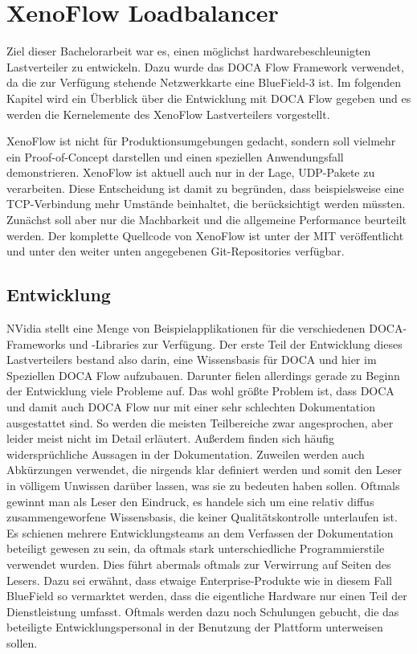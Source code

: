 \chapter{XenoFlow Loadbalancer}
\label{cha:implementation}
Ziel dieser Bachelorarbeit war es, einen möglichst hardwarebeschleunigten Lastverteiler zu entwickeln. Dazu wurde das DOCA Flow Framework verwendet, da die zur Verfügung stehende Netzwerkkarte eine BlueField-3 ist. Im folgenden Kapitel wird ein Überblick über die Entwicklung mit DOCA Flow gegeben und es werden die Kernelemente des XenoFlow Lastverteilers vorgestellt. 

XenoFlow ist nicht für Produktionsumgebungen gedacht, sondern soll vielmehr ein Proof-of-Concept darstellen und einen speziellen Anwendungsfall demonstrieren. XenoFlow ist aktuell auch nur in der Lage, UDP-Pakete zu verarbeiten. Diese Entscheidung ist damit zu begründen, dass beispielsweise eine TCP-Verbindung mehr Umstände beinhaltet, die berücksichtigt werden müssten. Zunächst soll aber nur die Machbarkeit und die allgemeine Performance beurteilt werden. Der komplette Quellcode von XenoFlow ist unter der MIT veröffentlicht und unter den weiter unten angegebenen Git-Repositories verfügbar.
\section{Entwicklung}
NVidia stellt eine Menge von Beispielapplikationen für die verschiedenen DOCA-Frameworks und -Libraries zur Verfügung. Der erste Teil der Entwicklung dieses Lastverteilers bestand also darin, eine Wissensbasis für DOCA und hier im Speziellen DOCA Flow aufzubauen. Darunter fielen allerdings gerade zu Beginn der Entwicklung viele Probleme auf. Das wohl größte Problem ist, dass DOCA und damit auch DOCA Flow nur mit einer sehr schlechten Dokumentation ausgestattet sind. So werden die meisten Teilbereiche zwar angesprochen, aber leider meist nicht im Detail erläutert. Außerdem finden sich häufig widersprüchliche Aussagen in der Dokumentation. Zuweilen werden auch Abkürzungen verwendet, die nirgends klar definiert werden und somit den Leser in völligem Unwissen darüber lassen, was sie zu bedeuten haben sollen. Oftmals gewinnt man als Leser den Eindruck, es handele sich um eine relativ diffus zusammengeworfene Wissensbasis, die keiner Qualitätskontrolle unterlaufen ist. Es schienen mehrere Entwicklungsteams an dem Verfassen der Dokumentation beteiligt gewesen zu sein, da oftmals stark unterschiedliche Programmierstile verwendet wurden. Dies führt abermals oftmals zur Verwirrung auf Seiten des Lesers. Dazu sei erwähnt, dass etwaige Enterprise-Produkte wie in diesem Fall BlueField so vermarktet werden, dass die eigentliche Hardware nur einen Teil der Dienstleistung umfasst. Oftmals werden dazu noch Schulungen gebucht, die das beteiligte Entwicklungspersonal in der Benutzung der Plattform unterweisen sollen. 

